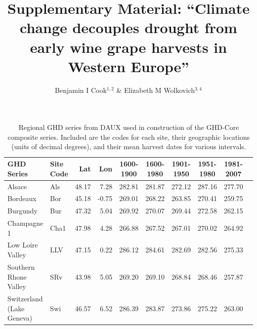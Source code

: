 \documentclass[12pt]{article}
\title{Supplementary Material: 
``Climate change decouples drought from early wine grape harvests in Western Europe''}
\author{Benjamin I Cook$^{1,2}$ \& Elizabeth M Wolkovich$^{3,4}$}
\begin{document}
\maketitle



\begin{table}
\small
\caption{\small Regional GHD series from DAUX used in construction of the GHD-Core composite series. Included are the codes for each site, their geographic locations (units of decimal degrees), and their mean harvest dates for various intervals.}
\centering
\begin{tabular}{| l l | r r | c c c c c p{5cm} |}
\hline
 \bf GHD Series & \bf Site Code & \bf Lat & \bf Lon & \bf 1600-1900 & \bf 1600-1980 & \bf 1901-1950 & \bf 1951-1980 & \bf 1981-2007 \\
\hline
Alsace	& Als & 48.17 & 7.28 & 282.81 & 281.87 & 272.12 & 287.16	 & 277.70 \\
Bordeaux	& Bor	& 45.18 & -0.75	& 269.01 & 	268.22	&  263.85 &  270.41 &  259.75\\
Burgundy	& Bur	& 47.32	& 5.04	& 269.92	& 270.07	& 269.44	& 272.58	& 262.15\\
Champagne 1	& Cha1	& 47.98	& 4.28	& 266.88	& 267.52	& 267.01	& 270.02	& 264.92\\
Low Loire Valley	& LLV	& 47.15	& 0.22	& 286.12	& 284.61	& 282.69	& 282.56	& 275.33\\
Southern Rhone Valley	& SRv	& 43.98	& 5.05	& 269.20	& 269.10	& 268.84	& 268.46	& 257.87\\
Switzerland (Lake Geneva)	& Swi	& 46.57	& 6.52	& 286.39	& 283.87	& 273.86	& 275.22	& 263.00\\
\hline
\end{tabular}
\end{table}
\end{document}
